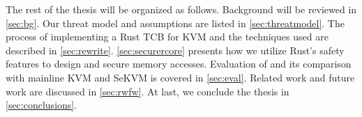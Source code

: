 The rest of the thesis will be organized as follows. Background
will be reviewed in \autoref{sec:bg}. Our threat model and assumptions are
listed in \autoref{sec:threatmodel}. The process of implementing a Rust TCB
for KVM and the techniques used are described in \autoref{sec:rewrite}.
\autoref{sec:securercore} presents how we utilize Rust's safety features to
design and secure \rustcore{} memory accesses.
Evaluation of \rustsec{} and its comparison with mainline KVM and SeKVM is
covered in \autoref{sec:eval}. Related work and future work are discussed in
\autoref{sec:rwfw}. At last, we conclude the thesis in
\autoref{sec:conclusions}.
